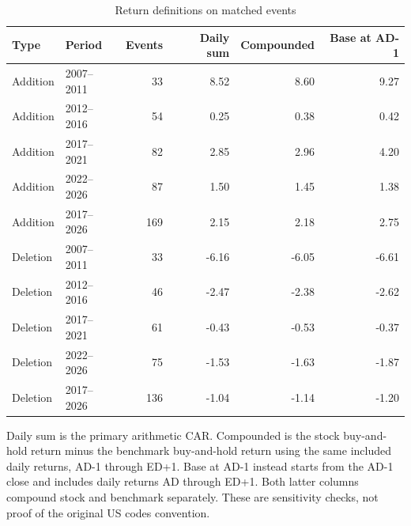 \begin{table}[!htbp]
\centering
\caption{Return definitions on matched events}\label{tab:return_conventions}
\small
\setlength{\tabcolsep}{5pt}
\begin{tabular}{llrrrr}
\toprule
Type & Period & Events & Daily sum & Compounded & Base at AD-1 \\
\midrule
Addition & 2007--2011 & 33 & 8.52 & 8.60 & 9.27 \\
Addition & 2012--2016 & 54 & 0.25 & 0.38 & 0.42 \\
Addition & 2017--2021 & 82 & 2.85 & 2.96 & 4.20 \\
Addition & 2022--2026 & 87 & 1.50 & 1.45 & 1.38 \\
Addition & 2017--2026 & 169 & 2.15 & 2.18 & 2.75 \\
Deletion & 2007--2011 & 33 & -6.16 & -6.05 & -6.61 \\
Deletion & 2012--2016 & 46 & -2.47 & -2.38 & -2.62 \\
Deletion & 2017--2021 & 61 & -0.43 & -0.53 & -0.37 \\
Deletion & 2022--2026 & 75 & -1.53 & -1.63 & -1.87 \\
Deletion & 2017--2026 & 136 & -1.04 & -1.14 & -1.20 \\
\bottomrule
\end{tabular}
\begin{minipage}{\linewidth}\footnotesize\vspace{5pt}
Daily sum is the primary arithmetic CAR. Compounded is the stock buy-and-hold return minus the benchmark buy-and-hold return using the same included daily returns, AD-1 through ED+1. Base at AD-1 instead starts from the AD-1 close and includes daily returns AD through ED+1. Both latter columns compound stock and benchmark separately. These are sensitivity checks, not proof of the original US code\textquotesingle{}s convention.
\end{minipage}
\end{table}
